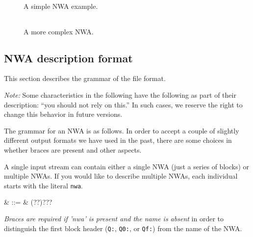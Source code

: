 \begin{figure}
  \centering
  \begin{tabular}{|p{1.75in}|}
    
  \end{tabular}
  \caption{A simple NWA example. }
  \label{Fi:nwa-simple}
\end{figure}

\begin{figure}
  \centering
  \begin{tabular}{|p{5.5in}|}
    
  \end{tabular}
  \caption {A more complex NWA. }
  \label{Fi:nwa-mattf}
\end{figure}

\subsection{NWA description format}
\label{Se:nwa-grammar}

This section describes the grammar of the file format.

\emph{Note:} Some characteristics in the following have the
following as part of their description: ``you should not rely on
this.'' In such cases, we reserve the right to change this behavior in
future versions. %



The grammar for an NWA is as follows. In order to accept a couple of
slightly different output formats we have used in the past, there are
some choices in whether braces are present and other aspects.


A single input stream can contain either a single NWA (just a series
of blocks) or multiple NWAs. If you would like to describe multiple
NWAs, each individual starts with the literal \texttt{nwa}.


\begin{grammar}
   & ::= & \left(\cfgsp{}?\cfgsp\term{:}?\right)?\cfgsp\term{\{}?\cfgsp{}\cfgsp\term{\}}?
\end{grammar}

\emph{Braces are required if 'nwa' is present and the name is absent}
 in order to
 distinguish the first block header (\texttt{Q:}, \texttt{Q0:},
 or \texttt{Qf:}) from the name of the NWA.

